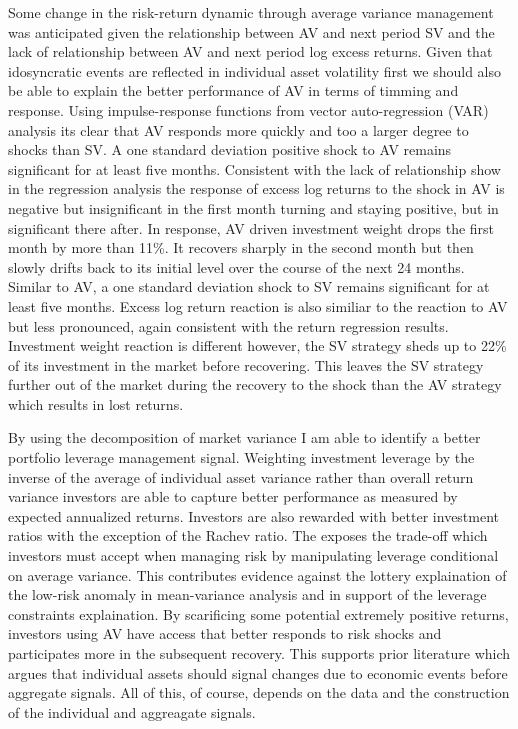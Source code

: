 Some change in the risk-return dynamic through average variance management was anticipated given the relationship between AV and next period SV and the lack of relationship between AV and next period log excess returns. Given that idosyncratic events are reflected in individual asset volatility first we should also be able to explain the better performance of AV in terms of timming and response. Using impulse-response functions from vector auto-regression (VAR) analysis its clear that AV responds more quickly and too a larger degree to shocks than SV. A one standard deviation positive shock to AV remains significant for at least five months. Consistent with the lack of relationship show in the regression analysis the response of excess log returns to the shock in AV is negative but insignificant in the first month turning and staying positive, but in significant there after. In response, AV driven investment weight drops the first month by more than 11\%. It recovers sharply in the second month but then slowly drifts back to its initial level over the course of the next 24 months. Similar to AV, a one standard deviation shock to SV remains significant for at least five months. Excess log return reaction is also similiar to the reaction to AV but less pronounced, again consistent with the return regression results. Investment weight reaction is different however, the SV strategy sheds up to 22\% of its investment in the market before recovering. This leaves the SV strategy further out of the market during the recovery to the shock than the AV strategy which results in lost returns.

By using the decomposition of market variance I am able to identify a better portfolio leverage management signal. Weighting investment leverage by the inverse of the average of individual asset variance rather than overall return variance investors are able to capture better performance as measured by expected annualized returns. Investors are also rewarded with better investment ratios with the exception of the Rachev ratio. The exposes the trade-off which investors must accept when managing risk by manipulating leverage conditional on average variance. This contributes evidence against the lottery explaination of the low-risk anomaly in mean-variance analysis and in support of the leverage constraints explaination. By scarificing some potential extremely positive returns, investors using AV have access that better responds to risk shocks and participates more in the subsequent recovery. This supports prior literature which argues that individual assets should signal changes due to economic events before aggregate signals. All of this, of course, depends on the data and the construction of the individual and aggreagate signals.